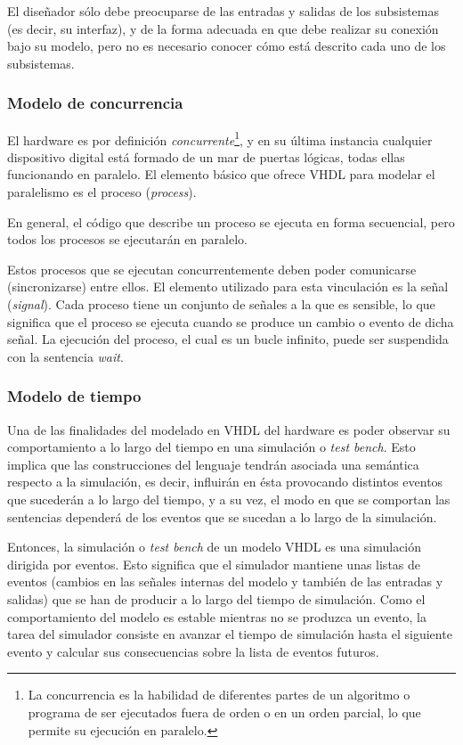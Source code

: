 El diseñador sólo debe preocuparse de las entradas y salidas de los subsistemas (es decir, su interfaz), y de la forma adecuada en que debe realizar su conexión bajo su modelo, pero no es necesario conocer cómo está descrito cada uno de los subsistemas.


\subsubsection{Modelo de concurrencia}

El hardware es por definición \emph{concurrente}\footnote{La concurrencia es la habilidad de diferentes partes de un algoritmo o programa de ser ejecutados fuera de orden o en un orden parcial, lo que permite su ejecución en paralelo.}, y en su última instancia cualquier dispositivo digital está formado de un mar de puertas lógicas, todas ellas funcionando en paralelo. El elemento básico que ofrece VHDL para modelar el paralelismo es el proceso (\emph{process}).

En general, el código que describe un proceso se ejecuta en forma secuencial, pero todos los procesos se ejecutarán en paralelo.

Estos procesos que se ejecutan concurrentemente deben poder comunicarse (sincronizarse) entre ellos. El elemento utilizado para esta vinculación es la señal (\emph{signal}). Cada proceso tiene un conjunto de señales a la que es sensible, lo que significa que el proceso se ejecuta cuando se produce un cambio o evento de dicha señal. La ejecución del proceso, el cual es un bucle infinito, puede ser suspendida con la sentencia \emph{wait}.

\subsubsection{Modelo de tiempo}

Una de las finalidades del modelado en VHDL del hardware es poder observar su comportamiento a lo largo del tiempo en una simulación o \emph{test bench}. Esto implica que las construcciones del lenguaje tendrán asociada una semántica respecto a la simulación, es decir, influirán en ésta provocando distintos eventos que sucederán a lo largo del tiempo, y a su vez, el modo en que se comportan las sentencias dependerá de los eventos que se sucedan a lo largo de la simulación.

Entonces, la simulación o \emph{test bench} de un modelo VHDL es una simulación dirigida por eventos. Esto significa que el simulador mantiene unas listas de eventos (cambios en las señales internas del modelo y también de las entradas y salidas) que se han de producir a lo largo del tiempo de simulación. Como el comportamiento del modelo es estable mientras no se produzca un evento, la tarea del simulador consiste en avanzar el tiempo de simulación hasta el siguiente evento y calcular sus consecuencias sobre la lista de eventos futuros.

